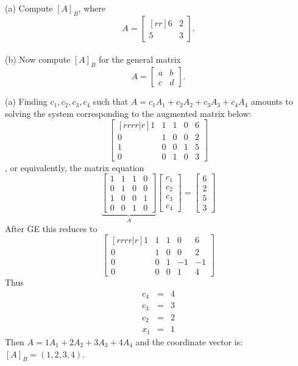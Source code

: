 (a) Compute $[A]_B$, where $$A = 
\begin{bmatrix}[rr]
6&2\\
5&3
\end{bmatrix}.$$
\vspace{.1in}
\\
(b) Now compute $[A]_B$ for the general matrix 
\[
A=
\begin{bmatrix}
a&b\\ c&d
\end{bmatrix}.
\]
\begin{solution}
\noindent
(a) Finding $c_1, c_2, c_3, c_4$ such that $A=c_1A_1+c_2A_2+c_3A_3+c_4A_4$ amounts to solving the system corresponding to the augmented matrix below:
$$
\begin{bmatrix}[rrrr|r]
1&1&1&0&6\\
0&1&0&0&2\\
1&0&0&1&5\\
0&0&1&0&3
\end{bmatrix}
$$,
or equivalently, the matrix equation 
\[
\underset{A}{\underbrace{\begin{bmatrix}
1&1&1&0\\
0&1&0&0\\
1&0&0&1\\
0&0&1&0
\end{bmatrix}}}
\begin{bmatrix}
c_1\\ c_2\\ c_3\\ c_4
\end{bmatrix}=
\begin{bmatrix}
6\\ 2\\ 5\\ 3
\end{bmatrix}
\]
After GE this reduces to 
\[
\begin{bmatrix}[rrrr|r]
1&1&1&0&6\\
0&1&0&0&2\\
0&0&1&-1&-1\\
0&0&0&1&4
\end{bmatrix}
\]
Thus
\begin{eqnarray*}
c_4 &=& 4\\
c_3 &=& 3\\
c_2 &=& 2\\
x_1 &=& 1
\end{eqnarray*}
Then $A = 1A_1 + 2A_2 +3A_3 +4A_4$ and the coordinate vector is:\\ $[A]_B = (1,2,3,4)$.
\vspace{.1in}

\end{solution}

